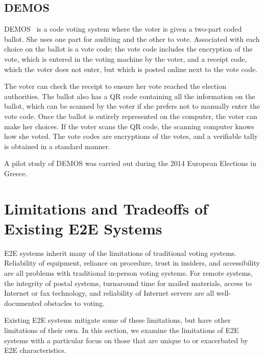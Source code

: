 \subsection{DEMOS}

DEMOS~\cite{kiayias2014} is a code voting system where the voter is
given a two-part coded ballot. She uses one part for auditing and the
other to vote. Associated with each choice on the ballot is a vote
code; the vote code includes the encryption of the vote, which is
entered in the voting machine by the voter, and a receipt code, which
the voter does not enter, but which is posted online next to the vote
code.

The voter can check the receipt to ensure her vote reached the
election authorities. The ballot also has a QR code containing all the
information on the ballot, which can be scanned by the voter if she
prefers not to manually enter the vote code. Once the ballot is
entirely represented on the computer, the voter can make her
choices. If the voter scans the QR code, the scanning computer knows
how she voted. The vote codes are encryptions of the votes, and a
verifiable tally is obtained in a standard manner.

A pilot study of DEMOS was carried out during the 2014 European
Elections in Greece.

\section{Limitations and Tradeoffs of Existing E2E Systems}
\label{sec:limit-exist-syst}

E2E systems inherit many of the limitations of traditional voting
systems. Reliability of equipment, reliance on procedure, trust in
insiders, and accessibility are all problems with traditional
in-person voting systems. For remote systems, the integrity of postal
systems, turnaround time for mailed materials, access to Internet or
fax technology, and reliability of Internet servers are all
well-documented obstacles to voting. 

Existing E2E systems mitigate some of these limitations, but have
other limitations of their own. In this section, we examine the
limitations of E2E systems with a particular focus on those that are
unique to or exacerbated by E2E characteristics.


